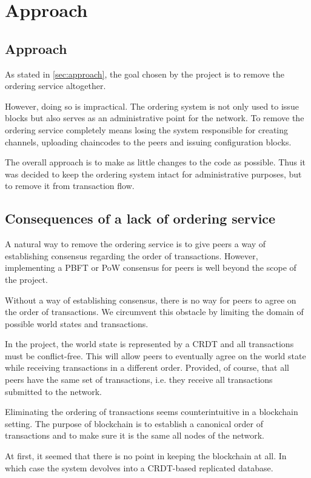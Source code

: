 \chapter{Approach}\label{chapter:approach}
\section{Approach}
As stated in \ref{sec:approach}, the goal chosen by the project is to remove the ordering service altogether.

However, doing so is impractical. The ordering system is not only used to issue blocks but also serves as an administrative point for the network. To remove the ordering service completely means losing the system responsible for creating channels, uploading chaincodes to the peers and issuing configuration blocks.

The overall approach is to make as little changes to the code as possible.
Thus it was decided to keep the ordering system intact for administrative purposes, but to remove it from transaction flow.

\section{Consequences of a lack of ordering service}
\label{sec:app-noorder}

A natural way to remove the ordering service is to give peers a way of establishing consensus regarding the order of transactions. However, implementing a PBFT or PoW consensus for peers is well beyond the scope of the project.

Without a way of establishing consensus, there is no way for peers to agree on the order of transactions. We circumvent this obstacle by limiting the domain of possible world states and transactions.

In the project, the world state is represented by a CRDT and all transactions must be conflict-free. This will allow peers to eventually agree on the world state while receiving transactions in a different order. Provided, of course, that all peers have the same set of transactions, i.e. they receive all transactions submitted to the network.

Eliminating the ordering of transactions seems counterintuitive in a blockchain setting. The purpose of blockchain is to establish a canonical order of transactions and to make sure it is the same all nodes of the network.

At first, it seemed that there is no point in keeping the blockchain at all. In which case the system devolves into a CRDT-based replicated database.

